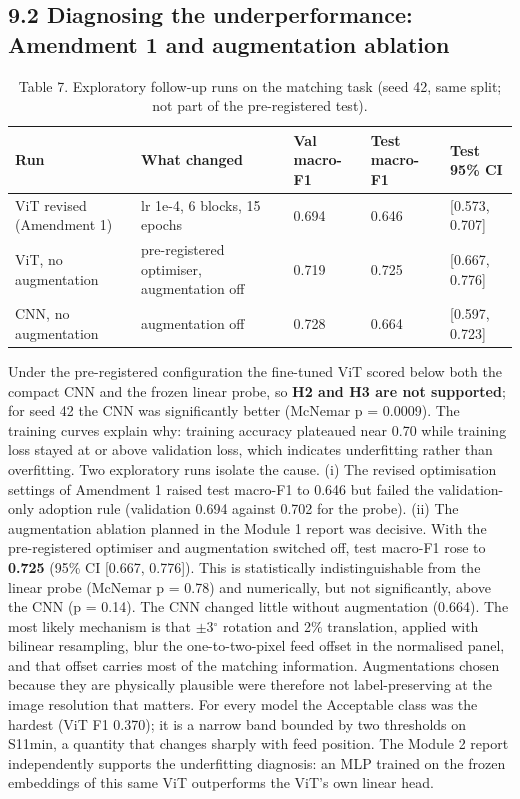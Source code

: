 \documentclass[11pt,a4paper]{article}
\begin{document}
\subsection*{9.2 Diagnosing the underperformance: Amendment 1 and augmentation ablation}
\begin{table}[H]\centering\small
\caption*{Table 7. Exploratory follow-up runs on the matching task (seed 42, same split; not part of the pre-registered test).}
\begin{tabularx}{\linewidth}{XXXXX}
\toprule
\textbf{Run} & \textbf{What changed} & \textbf{Val macro-F1} & \textbf{Test macro-F1} & \textbf{Test 95\% CI} \\
\midrule
ViT revised (Amendment 1) & lr 1e-4, 6 blocks, 15 epochs & 0.694 & 0.646 & [0.573, 0.707] \\
ViT, no augmentation & pre-registered optimiser, augmentation off & 0.719 & 0.725 & [0.667, 0.776] \\
CNN, no augmentation & augmentation off & 0.728 & 0.664 & [0.597, 0.723] \\
\bottomrule
\end{tabularx}
\end{table}
Under the pre-registered configuration the fine-tuned ViT scored below both the compact CNN and the frozen linear probe, so \textbf{H2 and H3 are not supported}; for seed 42 the CNN was significantly better (McNemar p = 0.0009). The training curves explain why: training accuracy plateaued near 0.70 while training loss stayed at or above validation loss, which indicates underfitting rather than overfitting. Two exploratory runs isolate the cause. (i) The revised optimisation settings of Amendment 1 raised test macro-F1 to 0.646 but failed the validation-only adoption rule (validation 0.694 against 0.702 for the probe). (ii) The augmentation ablation planned in the Module 1 report was decisive. With the pre-registered optimiser and augmentation switched off, test macro-F1 rose to \textbf{0.725} (95\% CI [0.667, 0.776]). This is statistically indistinguishable from the linear probe (McNemar p = 0.78) and numerically, but not significantly, above the CNN (p = 0.14). The CNN changed little without augmentation (0.664). The most likely mechanism is that $\pm$3$^\circ$ rotation and 2\% translation, applied with bilinear resampling, blur the one-to-two-pixel feed offset in the normalised panel, and that offset carries most of the matching information. Augmentations chosen because they are physically plausible were therefore not label-preserving at the image resolution that matters. For every model the Acceptable class was the hardest (ViT F1 0.370); it is a narrow band bounded by two thresholds on S11min, a quantity that changes sharply with feed position. The Module 2 report independently supports the underfitting diagnosis: an MLP trained on the frozen embeddings of this same ViT outperforms the ViT's own linear head.
\end{document}
